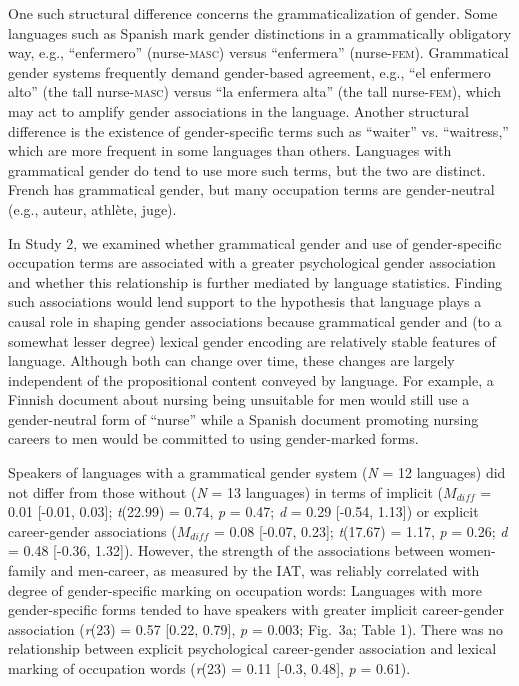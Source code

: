 \documentclass[9pt,twocolumn]{pnas-new}
\begin{document}
One such structural difference concerns the
grammaticalization of gender. Some languages such as Spanish mark gender
distinctions in a grammatically obligatory way, e.g.,
\enquote{enfermero} (nurse-\textsc{masc}) versus \enquote{enfermera}
(nurse-\textsc{fem}). Grammatical gender systems frequently demand
gender-based agreement, e.g., \enquote{el enfermero alto} (the tall
nurse-\textsc{masc}) versus \enquote{la enfermera alta} (the tall
nurse-\textsc{fem}), which may act to
amplify gender associations in the language. Another structural difference is the existence of gender-specific terms such as  \enquote{waiter} vs.
\enquote{waitress,} which are more frequent in some languages than others.  Languages with grammatical gender do tend to use
more such terms, but the two are distinct. French has grammatical
gender, but many occupation terms are gender-neutral (e.g., auteur,
athlète, juge).

In Study 2, we examined whether grammatical gender and use of
gender-specific occupation terms are associated with a greater
psychological gender association and whether this relationship is further
mediated by language statistics. Finding such associations would lend support to the hypothesis that language plays a causal role in shaping gender associations because grammatical gender and (to a somewhat lesser degree) lexical gender encoding are relatively stable features of language. Although both can change over time, these changes are largely independent of the propositional content conveyed by language. For example, a Finnish document about nursing being unsuitable for men would still use a gender-neutral form of
\enquote{nurse} while a Spanish document promoting nursing careers to
men would be committed to using gender-marked forms.


Speakers of languages with a grammatical gender system (\emph{N} = 12 languages) did not differ from those without (\emph{N} = 13 languages) in terms of implicit ($M_{diff}$ = 0.01 {[}-0.01, 0.03{]}; \emph{t}(22.99) = 0.74, \emph{p} = 0.47; \emph{d} = 0.29 {[}-0.54, 1.13{]}) or explicit career-gender associations ($M_{diff}$ = 0.08 {[}-0.07, 0.23{]}; \emph{t}(17.67) = 1.17, \emph{p} = 0.26; \emph{d} = 0.48 {[}-0.36, 1.32{]}). However, the strength of the associations between women-family and men-career, as measured by the IAT, was reliably correlated with degree of gender-specific marking on
occupation words: Languages with more gender-specific forms tended to
have speakers with greater implicit career-gender association (\emph{r}(23) = 0.57 {[}0.22, 0.79{]}, \emph{p} = 0.003; Fig.\ 3a; Table 1). There
was no relationship between explicit psychological career-gender association and
lexical marking of occupation words (\emph{r}(23) = 0.11 {[}-0.3, 0.48{]}, \emph{p} = 0.61).
\end{document}

